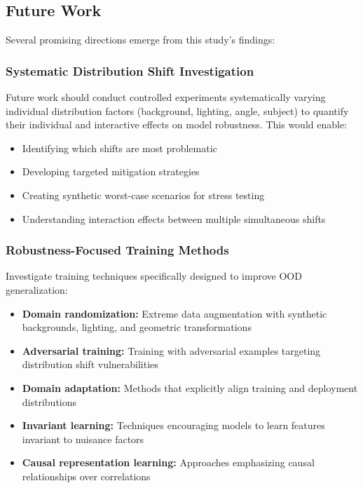 \documentclass[12pt,a4paper]{article}
\begin{document}
\subsection{Future Work}

Several promising directions emerge from this study's findings:

\subsubsection{Systematic Distribution Shift Investigation}

Future work should conduct controlled experiments systematically varying individual distribution factors (background, lighting, angle, subject) to quantify their individual and interactive effects on model robustness. This would enable:

\begin{itemize}
    \item Identifying which shifts are most problematic
    \item Developing targeted mitigation strategies
    \item Creating synthetic worst-case scenarios for stress testing
    \item Understanding interaction effects between multiple simultaneous shifts
\end{itemize}

\subsubsection{Robustness-Focused Training Methods}

Investigate training techniques specifically designed to improve OOD generalization:

\begin{itemize}
    \item \textbf{Domain randomization:} Extreme data augmentation with synthetic backgrounds, lighting, and geometric transformations
    
    \item \textbf{Adversarial training:} Training with adversarial examples targeting distribution shift vulnerabilities
    
    \item \textbf{Domain adaptation:} Methods that explicitly align training and deployment distributions
    
    \item \textbf{Invariant learning:} Techniques encouraging models to learn features invariant to nuisance factors
    
    \item \textbf{Causal representation learning:} Approaches emphasizing causal relationships over correlations
\end{itemize}
\end{document}
